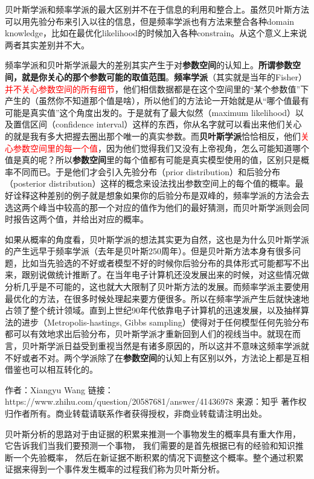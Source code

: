 \documentclass[UTF8]{ctexbook}
\begin{document}
贝叶斯学派和频率学派的最大区别并不在于信息的利用和整合上。虽然贝叶斯方法可以用先验分布来引入以往的信息，但是频率学派也有方法来整合各种domain knowledge，比如在最优化likelihood的时候加入各种constrain。从这个意义上来说两者其实差别并不大。


频率学派和贝叶斯学派最大的差别其实产生于对\textbf{参数空间}的认知上。\textbf{所谓参数空间，就是你关心的那个参数可能的取值范围}。\textbf{频率学派}（其实就是当年的Fisher）\textcolor{red}{并不关心参数空间的所有细节}，他们相信数据都是在这个空间里的“某个参数值”下产生的（虽然你不知道那个值是啥），所以他们的方法论一开始就是从“哪个值最有可能是真实值”这个角度出发的。于是就有了最大似然（maximum likelihood）以及置信区间（confidence interval）这样的东西，你从名字就可以看出来他们关心的就是我有多大把握去圈出那个唯一的真实参数。而\textbf{贝叶斯学派}恰恰相反，他们\textcolor{red}{关心参数空间里的每一个值}，因为他们觉得我们又没有上帝视角，怎么可能知道哪个值是真的呢？所以\textbf{参数空间}里的每个值都有可能是真实模型使用的值，区别只是概率不同而已。于是他们才会引入先验分布（prior distribution）和后验分布（posterior distribution）这样的概念来设法找出参数空间上的每个值的概率。最好诠释这种差别的例子就是想象如果你的后验分布是双峰的，频率学派的方法会去选这两个峰当中较高的那一个对应的值作为他们的最好猜测，而贝叶斯学派则会同时报告这两个值，并给出对应的概率。

如果从概率的角度看，贝叶斯学派的想法其实更为自然，这也是为什么贝叶斯学派的产生远早于频率学派（去年是贝叶斯250周年）。但是贝叶斯方法本身有很多问题，比如当先验选的不好或者模型不好的时候你后验分布的具体形式可能都写不出来，跟别说做统计推断了。在当年电子计算机还没发展出来的时候，对这些情况做分析几乎是不可能的，这也就大大限制了贝叶斯方法的发展。而频率学派主要使用最优化的方法，在很多时候处理起来要方便很多。所以在频率学派产生后就快速地占领了整个统计领域。直到上世纪90年代依靠电子计算机的迅速发展，以及抽样算法的进步（Metropolis-hastings, Gibbs sampling）使得对于任何模型任何先验分布都可以有效地求出后验分布，贝叶斯学派才重新回到人们的视线当中。就现在而言，贝叶斯学派日益受到重视当然是有诸多原因的，所以这并不意味这频率学派就不好或者不对。两个学派除了在\textbf{参数空间}的认知上有区别以外，方法论上都是互相借鉴也可以相互转化的。

作者：Xiangyu Wang
链接：https://www.zhihu.com/question/20587681/answer/41436978
来源：知乎
著作权归作者所有。商业转载请联系作者获得授权，非商业转载请注明出处。

贝叶斯分析的思路对于由证据的积累来推测一个事物发生的概率具有重大作用， 它告诉我们当我们要预测一个事物， 我们需要的是首先根据已有的经验和知识推断一个先验概率， 然后在新证据不断积累的情况下调整这个概率。整个通过积累证据来得到一个事件发生概率的过程我们称为贝叶斯分析。
\end{document}
